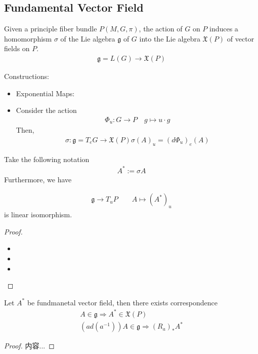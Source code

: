 \documentclass[Total.tex]{subfiles}
\begin{document}
				\subsection{Fundamental Vector Field} 
				\begin{Def}
					Given a principle fiber bundle $P(M,G,\pi)$, the action of $G$ on $P$ induces a homomorphism $\sigma$ of the Lie algebra $\mathfrak{g}$ of $G$ into the Lie algebra $\mathfrak{X}(P)$ of vector fields on $P$.
					\begin{gather*}
						\mathfrak{g}=L(G)\rightarrow \mathfrak{X}(P) 
					\end{gather*}
				\end{Def}
				Constructions:
				\begin{itemize}
					\item Exponential Maps:
					\item Consider the action 
					\begin{gather*}
						\Phi_u:G\rightarrow P\quad g\mapsto u\cdot g
					\end{gather*}
					Then,
					\begin{gather*}
						\sigma:\mathfrak{g}=T_e G\rightarrow \mathfrak{X}(P	) \sigma(A)_u=(d\Phi_u)_e(A)
					\end{gather*}
				\end{itemize}
				Take the following notation
				\begin{gather*}
					A^*:=\sigma A
				\end{gather*}
				Furthermore, we have
				\begin{proposition}
					\begin{gather*}
						\mathfrak{g}\rightarrow T_u P\qquad A\mapsto (A^*)_u
					\end{gather*}
					is linear isomorphism.
				\end{proposition}
				\begin{proof}
					\begin{itemize}
						\item 
						\item 
						\item 
					\end{itemize}
				\end{proof}
				
				\begin{proposition}
					Let $A^*$ be fundmanetal vector field, then there exists correspondence
					\begin{gather*}
						A\in \mathfrak{g}\Rightarrow A^*\in \mathfrak{X}(P)\\
						(ad(a^{-1}))A\in \mathfrak{g}\Rightarrow (R_a)_*A^*
					\end{gather*}
				\end{proposition}
				\begin{proof}
					内容...
				\end{proof}
				
\end{document}
